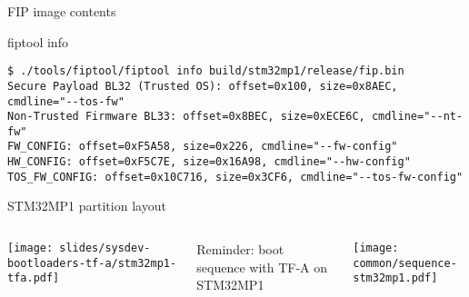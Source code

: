 \begin{frame}[fragile]{FIP image contents}
  \begin{block}{fiptool info}
    {\tiny
\begin{verbatim}
$ ./tools/fiptool/fiptool info build/stm32mp1/release/fip.bin
Secure Payload BL32 (Trusted OS): offset=0x100, size=0x8AEC, cmdline="--tos-fw"
Non-Trusted Firmware BL33: offset=0x8BEC, size=0xECE6C, cmdline="--nt-fw"
FW_CONFIG: offset=0xF5A58, size=0x226, cmdline="--fw-config"
HW_CONFIG: offset=0xF5C7E, size=0x16A98, cmdline="--hw-config"
TOS_FW_CONFIG: offset=0x10C716, size=0x3CF6, cmdline="--tos-fw-config"
\end{verbatim}
    }
  \end{block}
\end{frame}

\begin{frame}{STM32MP1 partition layout}
  \begin{columns}
  \begin{center}
    \texttt{[image: slides/sysdev-bootloaders-tf-a/stm32mp1-tfa.pdf]}
  \end{center}
  \small Reminder: boot sequence with TF-A on STM32MP1
  \begin{center}
    \texttt{[image: common/sequence-stm32mp1.pdf]}
  \end{center}
  \end{columns}
\end{frame}

